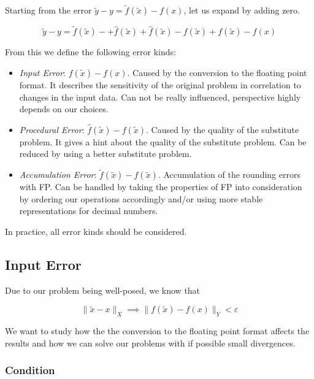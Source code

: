 Starting from the error \(\tilde{y} - y = \tilde{f}(\tilde{x}) - f(x)\), let us expand by adding zero. 

\[
    \tilde{y} - y = \tilde{f}(\tilde{x}) - + \hat{f}(\tilde{x}) + \hat{f}(\tilde{x}) - f(\tilde{x}) + f(\tilde{x}) - f(x)
\]

From this we define the following error kinds: 

\begin{itemize}

    \item \emph{Input Error}: \(f(\tilde{x}) - f(x)\). Caused by the conversion to the floating point format. It describes 
    the sensitivity of the original problem in correlation to changes in the input data. Can not be really influenced, perspective highly depends on our choices.

    \item \emph{Procedural Error}: \(\hat{f}(\tilde{x}) - f(\tilde{x})\). Caused by the quality of the substitute problem.
    It gives a hint about the quality of the substitute problem. Can be reduced by using a better substitute problem.

    \item \emph{Accumulation Error}: \(\tilde{f}(\tilde{x})- \hat{f}(\tilde{x})\). Accumulation of the rounding errors with FP. Can be handled by 
    taking the properties of FP into consideration by ordering our operations accordingly and/or using more stable representations for decimal numbers.

\end{itemize}

In practice, all error kinds should be considered.

\subsection{Input Error}

Due to our problem being well-posed, we know that 

\[
    \| \tilde{x} - x \|_X \implies \|f(\tilde{x}) - f(x)\|_Y < \varepsilon 
\]

We want to study how the the conversion to the floating point format affects the results and how 
we can solve our problems with if possible small divergences. 

\subsubsection{Condition}

